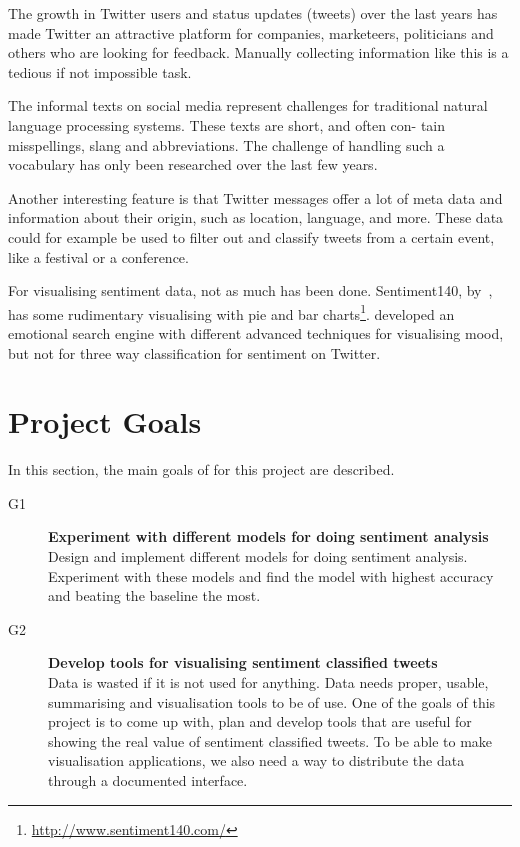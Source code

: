 The growth in Twitter users and status updates (tweets) over the last years has made Twitter an attractive platform for companies, marketeers, politicians and others who are looking for feedback. Manually collecting information like this is a tedious if not impossible task.

The informal texts on social media represent challenges for traditional natural language processing systems. These texts are short, and often con- tain misspellings, slang and abbreviations. The challenge of handling such a vocabulary has only been researched over the last few years.

Another interesting feature is that Twitter messages offer a lot of meta data and information about their origin, such as location, language, and more. These data could for example be used to filter out and classify tweets from a certain event, like a festival or a conference.

For visualising sentiment data, not as much has been done. Sentiment140, by~\cite{article:gimpel}, has some rudimentary visualising with pie and bar charts\footnote{\url{http://www.sentiment140.com/}}. \cite{article:wefeelfine} developed an emotional search engine with different advanced techniques for visualising mood, but not for three way classification for sentiment on Twitter.

\section{Project Goals}
\label{sec:projectgoals}

In this section, the main goals of for this project are described.

\begin{description}

\item[G1] \textbf{Experiment with different models for doing sentiment analysis} \\
	Design and implement different models for doing sentiment analysis. Experiment with these models and find the model with highest accuracy and beating the baseline the most. 
	
\item[G2] \textbf{Develop tools for visualising sentiment classified tweets} \\
    Data is wasted if it is not used for anything. Data needs proper, usable, summarising and visualisation tools to be of use. One of the goals of this project is to come up with, plan and develop tools that are useful for showing the real value of sentiment classified tweets. To be able to make visualisation applications, we also need a way to distribute the data through a documented interface. 

\end{description}


